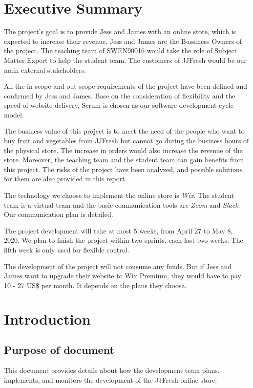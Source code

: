 \documentclass{report}
\begin{document}
\chapter*{Executive Summary}
  The project's goal is to provide Jess and James with an online store, which is expected to increase their revenue. Jess and James are the Bussiness Owners of the project. The teaching team of SWEN90016 would take the role of Subject Matter Expert to help the student team. The customers of JJFresh would be our main external stakeholders.

  All the in-scope and out-scope requirements of the project have been defined and confirmed by Jess and James. Base on the consideration of flexibility and the speed of website delivery, Scrum is chosen as our software development cycle model.

  The business value of this project is to meet the need of the people who want to buy fruit and vegetables from JJFresh but cannot go during the business hours of the physical store. The increase in orders would also increase the revenue of the store. Moreover, the teaching team and the student team can gain benefits from this project. The risks of the project have been analyzed, and possible solutions for them are also provided in this report. 

  The technology we choose to implement the online store is \textit{Wix}. The student team is a virtual team and the basic communication tools are \textit{Zoom} and \textit{Slack}. Our communication plan is detailed.

  The project development will take at most 5 weeks, from April 27 to May 8, 2020. We plan to finish the project within two sprints, each last two weeks. The fifth week is only used for flexible control. 

  The development of the project will not consume any funds. But if Jess and James want to upgrade their website to Wix Premium, they would have to pay 10 - 27 US\$ per month. It depends on the plans they choose.


\pagebreak
\clearpage

\tableofcontents
\pagebreak
\chapter{Introduction}
\label{chap:intro}
\section{Purpose of document}
   This document provides details about how the development team plans, implements, and monitors the development of the JJFresh online store. 
\end{document}
